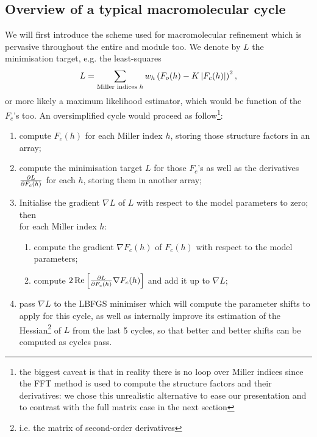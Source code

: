 \documentclass[12pt]{article}
\begin{document}
\subsection{Overview of a typical macromolecular cycle}

We will first introduce the scheme used for macromolecular refinement which is pervasive throughout the entire \mmtbx and \cctbx module too. We denote by $L$ the minimisation target, e.g. the least-squares
\begin{equation}
L = \sum_{\text{Miller indices $h$}} w_h \left(F_o(h) - K \left| F_c(h) \right|\right)^2,
\end{equation}
or more likely a maximum likelihood estimator, which would be function of the $F_c$'s too. An oversimplified cycle would proceed as follow\footnote{the biggest caveat is that in reality there is no loop over Miller indices since the FFT method is used to compute the structure factors and their derivatives: we chose this unrealistic alternative to ease our presentation and to contrast with the full matrix case in the next section}:
\begin{enumerate}
\item compute $F_c(h)$ for each Miller index $h$, storing those structure factors in an array;
\label{itemcomputefcalc}
\item compute the minimisation target $L$ for those $F_c$'s as well as the derivatives $\frac{\partial L}{\partial F_c(h)}$ for each $h$, storing them in another array;
\label{itemtargetlinearisation}
\item Initialise the gradient $\nabla L$ of $L$ with respect to the model parameters to zero; 
then\\ for each Miller index $h$:
\begin{enumerate}
\item compute the gradient $\nabla F_c(h)$ of $F_c(h)$ with respect to the model parameters;
\item compute $2\operatorname{Re} \left[\frac{\partial L}{\partial F_c(h)} \nabla F_c(h)\right]$ and add it up to $\nabla L$;
\end{enumerate}
\label{itemgradtarget}
\item pass $\nabla L$ to the LBFGS minimiser which will compute the parameter shifts to apply for this cycle, as well as internally improve its estimation of the Hessian\footnote{i.e. the matrix of second-order derivatives} of $L$ from the last 5 cycles, so that better and better shifts can be computed as cycles pass.
\end{enumerate}
\end{document}
